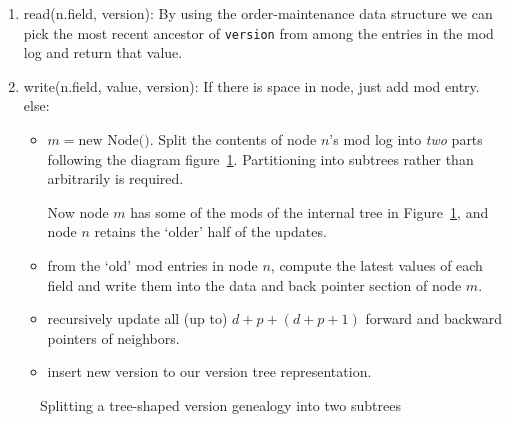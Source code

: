 \documentclass[11pt]{article}
\newcommand{\code}{\ttfamily}
\begin{document}
\begin{enumerate}
\item {{\code read(n.field, version)}}:
By using the order-maintenance data structure we can pick the most recent ancestor of \verb|version| from among the entries in the mod log and return that value.

\item {{\code write(n.field, value, version)}}: 
If there is space in node, just add mod entry.
else: 
\begin{itemize}
\item $m = \mbox{new Node()}$. Split the contents of node $n$'s mod log into {\em two} parts following the diagram figure~\ref{version-split}. Partitioning into subtrees rather than arbitrarily is required.

Now node $m$ has some of the mods of the internal tree in Figure~\ref{version-split}, and node $n$ retains the `older' half of the updates.

\item from the `old' mod entries in node $n$, compute the latest values of each field and write them into the data and back pointer section of node $m$.
\item recursively update all (up to)  $d + p + (d + p + 1)$ forward and backward pointers of neighbors.
\item insert new version to our version tree representation.
\end{itemize}

\end{enumerate}

\begin{figure}
  \begin{center}
  \end{center}
  \caption{\small Splitting a tree-shaped version genealogy into two subtrees}
  \label{version-split}
\end{figure}
\end{document}
